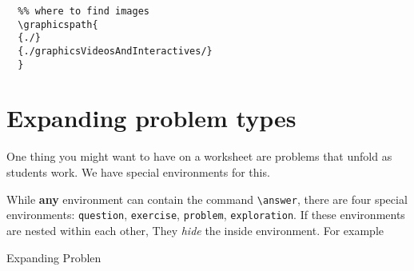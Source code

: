 \documentclass{ximera}
\begin{document}
\begin{verbatim}
  %% where to find images
  \graphicspath{
  {./}
  {./graphicsVideosAndInteractives/}
  }
  \end{verbatim}

\section{Expanding problem types}

One thing you might want to have on a worksheet are problems that unfold as
students work. We have special environments for this.

While \textbf{any} environment can contain the command \verb|\answer|,
there are four special environments: \verb|question|, \verb|exercise|,
\verb|problem|, \verb|exploration|. If these environments are nested within
each other, They \textit{hide} the inside environment. For example

\begin{problem}
Expanding Problen
\end{problem}
\end{document}
